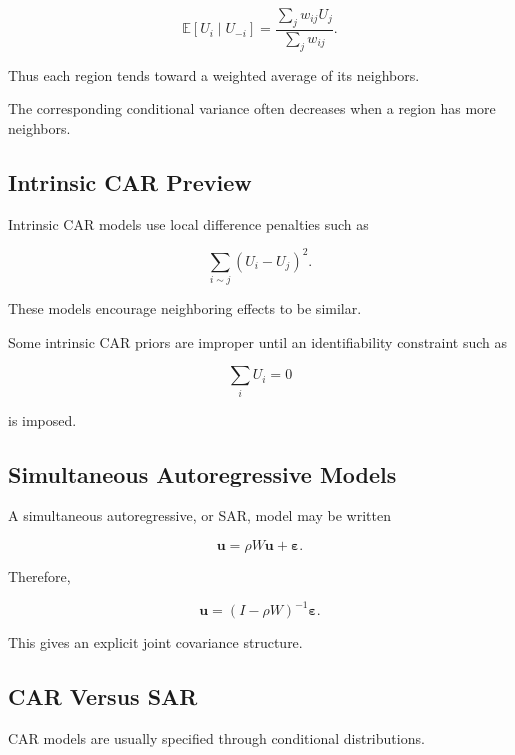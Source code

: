 \[
\boxed{
\mathbb{E}
[
U_i
\mid
U_{-i}
]
=
\frac{
\sum_j
w_{ij}U_j
}{
\sum_jw_{ij}
}.
}
\]

Thus each region tends toward a weighted average of its neighbors.

The corresponding conditional variance often decreases when a region has
more neighbors.

\subsection{Intrinsic CAR Preview}
\label{subsec:intrinsic-car-preview}

Intrinsic CAR models use local difference penalties such as

\[
\boxed{
\sum_{i\sim j}
(
U_i-U_j
)^2.
}
\]

These models encourage neighboring effects to be similar.

Some intrinsic CAR priors are improper until an identifiability
constraint such as

\[
\boxed{
\sum_iU_i=0
}
\]

is imposed.

\subsection{Simultaneous Autoregressive Models}
\label{subsec:simultaneous-autoregressive-models}

A simultaneous autoregressive, or SAR, model may be written

\[
\boxed{
\mathbf{u}
=
\rho W\mathbf{u}
+
\boldsymbol{\varepsilon}.
}
\]

Therefore,

\[
\boxed{
\mathbf{u}
=
(
I-\rho W
)^{-1}
\boldsymbol{\varepsilon}.
}
\]

This gives an explicit joint covariance structure.

\subsection{CAR Versus SAR}
\label{subsec:car-versus-sar}

CAR models are usually specified through conditional distributions.

